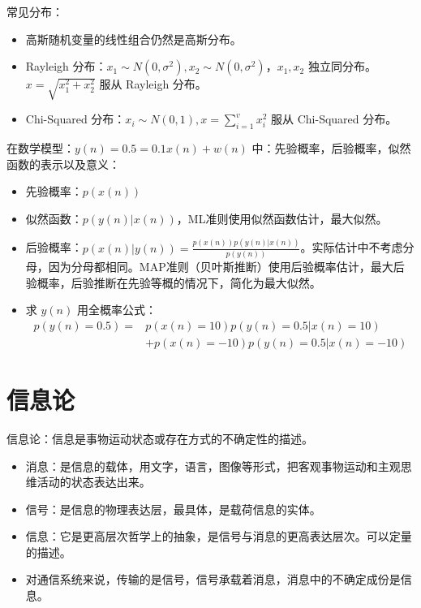 \begin{remark}
    常见分布：
    \begin{itemize}
        \item 高斯随机变量的线性组合仍然是高斯分布。
        \item Rayleigh 分布：$x_1\sim N(0, \sigma^2), x_2\sim N(0, \sigma^2)$，$x_1,x_2$ 独立同分布。$x = \sqrt{x_1^2 + x_2^2}$ 服从 Rayleigh 分布。   
        \item Chi-Squared 分布：$x_i\sim N(0, 1), x = \sum_{i = 1}^{v} x_i^2$ 服从 Chi-Squared 分布。
    \end{itemize}
\end{remark}

\begin{remark}
    在数学模型：$y(n) = 0.5 = 0.1x(n) + w(n)$ 中：先验概率，后验概率，似然函数的表示以及意义：
    \begin{itemize}
        \item 先验概率：$p(x(n))$
        \item 似然函数：$p(y(n)|x(n))$，ML准则使用似然函数估计，最大似然。
        \item 后验概率：$p(x(n)|y(n)) = \frac{p(x(n))p(y(n)|x(n))}{p(y(n))}$。实际估计中不考虑分母，因为分母都相同。MAP准则（贝叶斯推断）使用后验概率估计，最大后验概率，后验推断在先验等概的情况下，简化为最大似然。
        \item 求 $y(n)$ 用全概率公式：\begin{align*}
            p(y(n) = 0.5) =& p(x(n) = 10)p(y(n) = 0.5 | x(n) = 10) \\
            &+ p(x(n) = -10)p(y(n) = 0.5 | x(n) = -10)
        \end{align*}
    \end{itemize}
\end{remark}

\section{信息论}
\begin{remark}
    信息论：信息是事物运动状态或存在方式的不确定性的描述。
    \begin{itemize}
        \item 消息：是信息的载体，用文字，语言，图像等形式，把客观事物运动和主观思维活动的状态表达出来。
        \item 信号：是信息的物理表达层，最具体，是载荷信息的实体。
        \item 信息：它是更高层次哲学上的抽象，是信号与消息的更高表达层次。可以定量的描述。
        \item 对通信系统来说，传输的是信号，信号承载着消息，消息中的不确定成份是信息。
    \end{itemize}
\end{remark}

